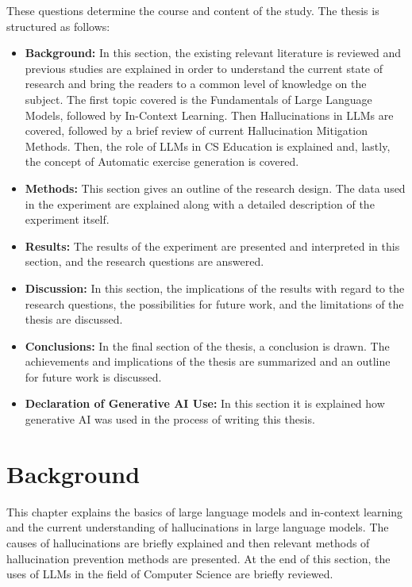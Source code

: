\documentclass[english, 12pt, a4paper, sci, utf8, a-2b, online]{latex/definitions/aaltothesis}
\begin{document}
These questions determine the course and content of the study. The thesis is structured as follows:
\begin{itemize}
    \item \textbf{Background:} In this section, the existing relevant literature is reviewed and previous studies are explained in order to understand the current state of research and bring the readers to a common level of knowledge on the subject. The first topic covered is the Fundamentals of Large Language Models, followed by In-Context Learning. Then Hallucinations in LLMs are covered, followed by a brief review of current Hallucination Mitigation Methods. Then, the role of LLMs in CS Education is explained and, lastly, the concept of Automatic exercise generation is covered.
    \item \textbf{Methods:} This section gives an outline of the research design. The data used in the experiment are explained along with a detailed description of the experiment itself.
    \item \textbf{Results:} The results of the experiment are presented and interpreted in this section, and the research questions are answered.
    \item \textbf{Discussion:} In this section, the implications of the results with regard to the research questions, the possibilities for future work, and the limitations of the thesis are discussed.
    \item \textbf{Conclusions:} In the final section of the thesis, a conclusion is drawn. The achievements and implications of the thesis are summarized and an outline for future work is discussed.
    \item \textbf{Declaration of Generative AI Use:} In this section it is explained how generative AI was used in the process of writing this thesis.
    \end{itemize}

\clearpage

\section{Background}

This chapter explains the basics of large language models and in-context learning and the current understanding of hallucinations in large language models. The causes of hallucinations are briefly explained and then relevant methods of hallucination prevention methods are presented. At the end of this section, the uses of LLMs in the field of Computer Science are briefly reviewed.
\end{document}
